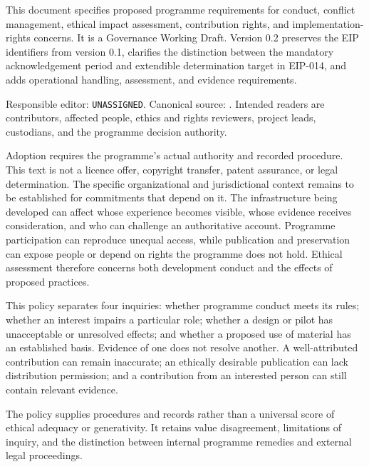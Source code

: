 \documentclass[11pt,a4paper]{article}
\begin{document}
\GSPfrontmatter
{}
This document specifies proposed programme requirements for conduct, conflict management, ethical impact assessment, contribution rights, and implementation-rights concerns. It is a Governance Working Draft. Version 0.2 preserves the EIP identifiers from version 0.1, clarifies the distinction between the mandatory acknowledgement period and extendible determination target in EIP-014, and adds operational handling, assessment, and evidence requirements.

Responsible editor: \texttt{UNASSIGNED}. Canonical source: . Intended readers are contributors, affected people, ethics and rights reviewers, project leads, custodians, and the programme decision authority.

Adoption requires the programme's actual authority and recorded procedure. This text is not a licence offer, copyright transfer, patent assurance, or legal determination. The specific organizational and jurisdictional context remains to be established for commitments that depend on it.
\tableofcontents
\clearpage
{}
The infrastructure being developed can affect whose experience becomes visible, whose evidence receives consideration, and who can challenge an authoritative account. Programme participation can reproduce unequal access, while publication and preservation can expose people or depend on rights the programme does not hold. Ethical assessment therefore concerns both development conduct and the effects of proposed practices.

This policy separates four inquiries: whether programme conduct meets its rules; whether an interest impairs a particular role; whether a design or pilot has unacceptable or unresolved effects; and whether a proposed use of material has an established basis. Evidence of one does not resolve another. A well-attributed contribution can remain inaccurate; an ethically desirable publication can lack distribution permission; and a contribution from an interested person can still contain relevant evidence.

The policy supplies procedures and records rather than a universal score of ethical adequacy or generativity. It retains value disagreement, limitations of inquiry, and the distinction between internal programme remedies and external legal proceedings.

\GSPmainmatter
\end{document}
